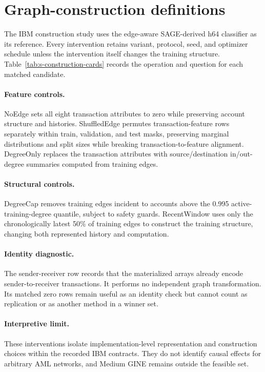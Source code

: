 \section{Graph-construction definitions}
\label{sec:s-constructions}

The IBM construction study uses the edge-aware SAGE-derived h64 classifier as its reference. Every intervention retains variant, protocol, seed, and optimizer schedule unless the intervention itself changes the training structure. Table~\ref{tab:s-construction-cards} records the operation and question for each matched candidate.



\paragraph{Feature controls.}
NoEdge sets all eight transaction attributes to zero while preserving account structure and histories. ShuffledEdge permutes transaction-feature rows separately within train, validation, and test masks, preserving marginal distributions and split sizes while breaking transaction-to-feature alignment. DegreeOnly replaces the transaction attributes with source/destination in/out-degree summaries computed from training edges.

\paragraph{Structural controls.}
DegreeCap removes training edges incident to accounts above the 0.995 active-training-degree quantile, subject to safety guards. RecentWindow uses only the chronologically latest 50\% of training edges to construct the training structure, changing both represented history and computation.

\paragraph{Identity diagnostic.}
The sender-receiver row records that the materialized arrays already encode sender-to-receiver transactions. It performs no independent graph transformation. Its matched zero rows remain useful as an identity check but cannot count as replication or as another method in a winner set.

\paragraph{Interpretive limit.}
These interventions isolate implementation-level representation and construction choices within the recorded IBM contracts. They do not identify causal effects for arbitrary AML networks, and Medium GINE remains outside the feasible set.
